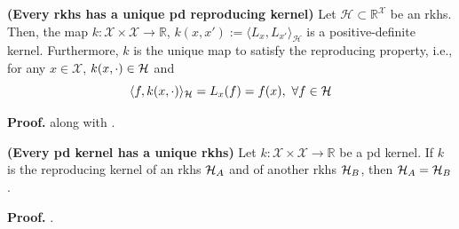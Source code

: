 \begin{proposition}
	\label{prop.unique_reprod_kernel}
	\textbf{(Every \ac{rkhs} has a unique \ac{pd} reproducing kernel)} 
	Let $\mathcal{H} \subset \mathbb{R}^\mathcal{X}$ be an \ac{rkhs}. Then, the map $k: \mathcal{X} \times \mathcal{X} \rightarrow \mathbb{R}$, $k(x,x') := \langle L_x, L_{x'} \rangle_\mathcal{H}$ is a positive-definite kernel. Furthermore, $k$ is the unique map to satisfy the reproducing property, i.e., for any $x \in \mathcal{X}$, $k(x,\cdot) \in \mathcal{H}$ and
	\begin{equation}
		\rkinner{f}{k(x,\cdot)} = L_x(f) = f(x), \ \forall f \in \rkhs
		\label{eq.reproducing_property}
	\end{equation} 
\end{proposition}

\begin{my_proof}
	\textbf{Proof.}
	 \cite[Lemma~2]{berlinet2011reproducing} along with \citep[Theorem~4.20]{steinwart2008svm_book}.
\end{my_proof}

\begin{proposition}
	\label{prop.unique_rkhs}
	\textbf{(Every \ac{pd} kernel has a unique \ac{rkhs})} 
	Let $k: \mathcal{X} \times \mathcal{X} \rightarrow \mathbb{R}$ be a \ac{pd} kernel. If $k$ is the reproducing kernel of an \ac{rkhs} $\mathcal{H}_A$ and of another \ac{rkhs} $\mathcal{H}_B$, then $\mathcal{H}_A = \mathcal{H}_B$.
\end{proposition}

\begin{my_proof}
	\textbf{Proof.}
	\citep[Theorem~4.21]{steinwart2008svm_book}.
\end{my_proof}

